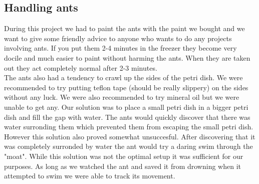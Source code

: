 
\subsection{Handling ants}
\label{ants}

During this project we had to paint the ants with the paint we bought and we want to give some friendly advice to anyone who wants to do any projects involving ants. If you put them 2-4 minutes in the freezer they become very docile and much easier to paint without harming the ants. When they are taken out they act completely normal after 2-3 minutes. \\

The ants also had a tendency to crawl up the sides of the petri dish. We were recommended to try putting teflon tape (should be really slippery) on the sides without any luck. We were also recommended to try mineral oil but we were unable to get any. Our solution was to place a small petri dish in a bigger petri dish and fill the gap with water. The ants would quickly discover that there was water surronding them which prevented them from escaping the small petri dish. However this solution also proved somewhat unsuccesful. After discovering that it was completely surronded by water the ant would try a daring swim through the "moat". While this solution was not the optimal setup it was sufficient for our purposes. As long as we watched the ant and saved it from drowning when it attempted to swim we were able to track its movement.
 